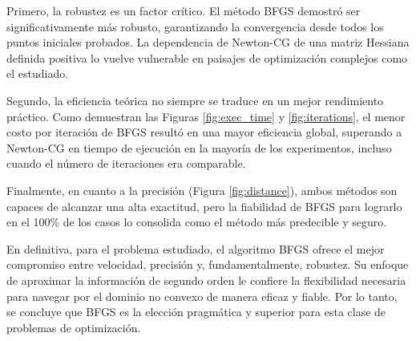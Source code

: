 \documentclass{article}
\begin{document}
Primero, la robustez es un factor crítico. El método BFGS demostró ser significativamente más robusto, garantizando la convergencia desde todos los puntos iniciales probados. La dependencia de Newton-CG de una matriz Hessiana definida positiva lo vuelve vulnerable en paisajes de optimización complejos como el estudiado.

Segundo, la eficiencia teórica no siempre se traduce en un mejor rendimiento práctico. Como demuestran las Figuras \ref{fig:exec_time} y \ref{fig:iterations}, el menor costo por iteración de BFGS resultó en una mayor eficiencia global, superando a Newton-CG en tiempo de ejecución en la mayoría de los experimentos, incluso cuando el número de iteraciones era comparable.

Finalmente, en cuanto a la precisión (Figura \ref{fig:distance}), ambos métodos son capaces de alcanzar una alta exactitud, pero la fiabilidad de BFGS para lograrlo en el 100\% de los casos lo consolida como el método más predecible y seguro.

En definitiva, para el problema estudiado, el algoritmo BFGS ofrece el mejor compromiso entre velocidad, precisión y, fundamentalmente, robustez. Su enfoque de aproximar la información de segundo orden le confiere la flexibilidad necesaria para navegar por el dominio no convexo de manera eficaz y fiable. Por lo tanto, se concluye que BFGS es la elección pragmática y superior para esta clase de problemas de optimización.
\end{document}
